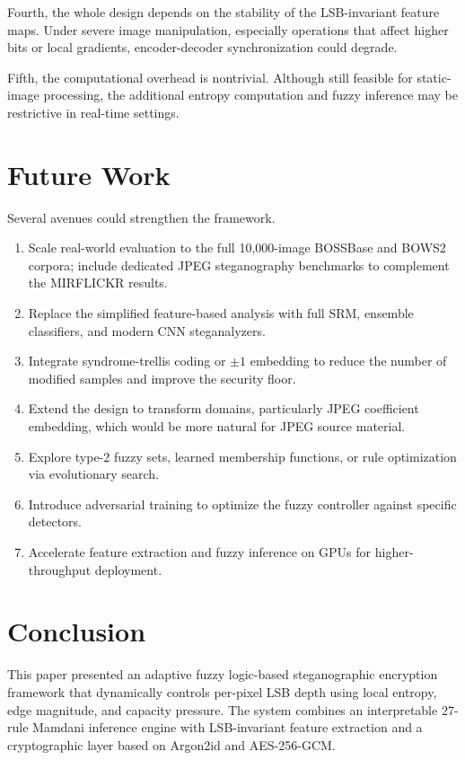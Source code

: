Fourth, the whole design depends on the stability of the LSB-invariant feature maps. Under severe image manipulation, especially operations that affect higher bits or local gradients, encoder-decoder synchronization could degrade.

Fifth, the computational overhead is nontrivial. Although still feasible for static-image processing, the additional entropy computation and fuzzy inference may be restrictive in real-time settings.

\section{Future Work}
Several avenues could strengthen the framework.
\begin{enumerate}[leftmargin=1.2cm]
    \item Scale real-world evaluation to the full 10,000-image BOSSBase and BOWS2 corpora; include dedicated JPEG steganography benchmarks to complement the MIRFLICKR results.
    \item Replace the simplified feature-based analysis with full SRM, ensemble classifiers, and modern CNN steganalyzers.
    \item Integrate syndrome-trellis coding or \(\pm 1\) embedding to reduce the number of modified samples and improve the security floor.
    \item Extend the design to transform domains, particularly JPEG coefficient embedding, which would be more natural for JPEG source material.
    \item Explore type-2 fuzzy sets, learned membership functions, or rule optimization via evolutionary search.
    \item Introduce adversarial training to optimize the fuzzy controller against specific detectors.
    \item Accelerate feature extraction and fuzzy inference on GPUs for higher-throughput deployment.
\end{enumerate}

\section{Conclusion}
This paper presented an adaptive fuzzy logic-based steganographic encryption framework that dynamically controls per-pixel LSB depth using local entropy, edge magnitude, and capacity pressure. The system combines an interpretable 27-rule Mamdani inference engine with LSB-invariant feature extraction and a cryptographic layer based on Argon2id and AES-256-GCM.

